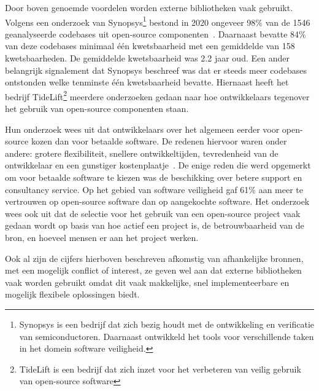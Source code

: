 Door boven genoemde voordelen worden externe bibliotheken vaak gebruikt. Volgens een onderzoek van Synopsys\footnote{Synopsys is een bedrijf dat zich bezig houdt met de ontwikkeling en verificatie van semiconductoren. Daarnaast ontwikkeld het tools voor verschillende taken in het domein software veiligheid.} bestond in 2020 ongeveer 98\% van de 1546 geanalyseerde codebases uit open-source componenten~\citep{Synopsys:2021}. Daarnaast bevatte 84\% van deze codebases minimaal één kwetsbaarheid met een gemiddelde van 158 kwetsbaarheden. De gemiddelde kwetsbaarheid was 2.2 jaar oud. Een ander belangrijk signalement dat Synopsys beschreef was dat er steeds meer codebases ontstonden welke tenminste één kwetsbaarheid bevatte. Hiernaast heeft het bedrijf TideLift\footnote{TideLift is een bedrijf dat zich inzet voor het verbeteren van veilig gebruik van open-source software} meerdere onderzoeken gedaan naar hoe ontwikkelaars tegenover het gebruik van open-source componenten staan.

Hun onderzoek wees uit dat ontwikkelaars over het algemeen eerder voor open-source kozen dan voor betaalde software. De redenen hiervoor waren onder andere: grotere flexibiliteit, snellere ontwikkeltijden, tevredenheid van de ontwikkelaar en een gunstiger kostenplaatje~\citep{TideLift:2021}. De enige reden die werd opgemerkt om voor betaalde software te kiezen was de beschikking over betere support en consultancy service. Op het gebied van software veiligheid gaf 61\% aan meer te vertrouwen op open-source software dan op aangekochte software.
Het onderzoek wees ook uit dat de selectie voor het gebruik van een open-source project vaak gedaan wordt op basis van hoe actief een project is, de betrouwbaarheid van de bron, en hoeveel mensen er aan het project werken.

Ook al zijn de cijfers hierboven beschreven afkomstig van afhankelijke bronnen, met een mogelijk conflict of interest, ze geven wel aan dat externe bibliotheken vaak worden gebruikt omdat dit vaak makkelijke, snel implementeerbare en mogelijk flexibele oplossingen biedt.

